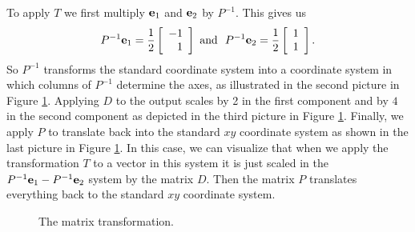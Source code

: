 To apply $T$ we first multiply $\mathbf{e}_1$ and $\mathbf{e}_2$ by $P^{-1}$. This gives us 
\[P^{-1}\mathbf{e}_1 = \frac{1}{2}\left[ \begin{array}{r} -1\\1 \end{array} \right] \text{ and } \ P^{-1}\mathbf{e}_2 = \frac{1}{2}\left[ \begin{array}{c} 1\\1 \end{array} \right]  .\]
So $P^{-1}$ transforms the standard coordinate system into a coordinate system in which columns of $P^{-1}$ determine the axes, as illustrated in the second picture in Figure \ref{F:4_c_1}. Applying $D$ to the output scales by 2 in the first component and by $4$ in the second component as depicted in the third picture in Figure \ref{F:4_c_1}. Finally, we apply $P$ to translate back into the standard $xy$ coordinate system as shown in the last picture in Figure \ref{F:4_c_1}.  In this case, we can visualize that when we apply the transformation $T$ to a vector in this system it is just scaled in the $P^{-1}\mathbf{e}_1-P^{-1}\mathbf{e}_2$ system  by the matrix $D$. Then the matrix $P$ translates everything back to the standard $xy$ coordinate system. 

\begin{figure}[ht]
\begin{center}
 \hspace{0.1in}   
 \hspace{0.1in}  
\end{center}
\caption{The matrix transformation.}
\label{F:4_c_1}
\end{figure}

